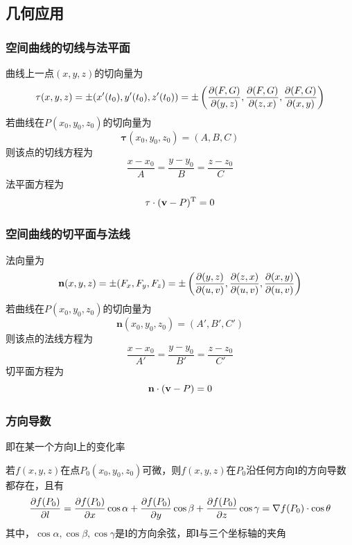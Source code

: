 \subsection{几何应用}
\subsubsection{空间曲线的切线与法平面}
曲线上一点$(x,y,z)$的切向量为
\[\mathbf{\tau}(x,y,z)=\pm(x'(t_0),y'(t_0),z'(t_0))=\pm\left(\dfrac{\partial (F,G)}{\partial (y,z)},\dfrac{\partial (F,G)}{\partial (z,x)},\dfrac{\partial (F,G)}{\partial (x,y)}\right)\]
若曲线在$P(x_0,y_0,z_0)$的切向量为
\[\mathbf{\tau}(x_0,y_0,z_0)=(A,B,C)\]
则该点的切线方程为
\[\frac{x-x_0}{A}=\frac{y-y_0}{B}=\frac{z-z_0}{C}\]
法平面方程为
\[\mathbf{\tau}\cdot(\mathbf{v}-P)^{\mathrm{T}}=0\]

\subsubsection{空间曲线的切平面与法线}
法向量为
\[\mathbf{n}(x,y,z)=\pm(F_x,F_y,F_z)=\pm\left(\dfrac{\partial (y,z)}{\partial (u,v)},\dfrac{\partial (z,x)}{\partial (u,v)},\dfrac{\partial (x,y)}{\partial (u,v)}\right)\]
若曲线在$P(x_0,y_0,z_0)$的切向量为
\[\mathbf{n}(x_0,y_0,z_0)=(A',B',C')\]
则该点的法线方程为
\[\frac{x-x_0}{A'}=\frac{y-y_0}{B'}=\frac{z-z_0}{C'}\]
切平面方程为
\[\mathbf{n}\cdot(\mathbf{v}-P)=0\]

\subsubsection{方向导数}
即在某一个方向$\mathbf{l}$上的变化率
\begin{theorem}
若$f(x,y,z)$在点$P_0(x_0,y_0,z_0)$可微，则$f(x,y,z)$在$P_0$沿任何方向$\mathbf{l}$的方向导数都存在，且有
\[\dfrac{\partial f(P_0)}{\partial l}=\dfrac{\partial f(P_0)}{\partial x}\cos\alpha+\dfrac{\partial f(P_0)}{\partial y}\cos\beta+\dfrac{\partial f(P_0)}{\partial z}\cos\gamma=\nabla f(P_0)\cdot\cos\theta\]
其中，$\cos\alpha,\cos\beta,\cos\gamma$是$\mathbf{l}$的方向余弦，即$\mathbf{l}$与三个坐标轴的夹角
\end{theorem}

